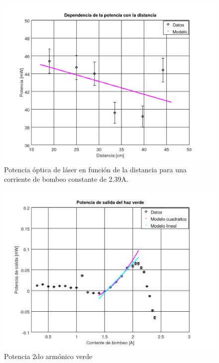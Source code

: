 \documentclass[10pt, a4paper]{article}%
\begin{document}
\begin{multicols}{2}
\begin{figure}[H]
    \centering
    \includegraphics[scale=0.4]{Graficos/potvsdist.png}
    \caption{Potencia óptica de láser en función de la distancia para una corriente de bombeo constante de 2.39A.}
    \label{laservsdist}
\end{figure}

\begin{figure}[H]
    \centering
    \includegraphics[scale=0.4]{Graficos/pot_verde1.png}
    \caption{Potencia 2do armónico verde}
    \label{potverde}
\end{figure}


\end{multicols}
\end{document}
